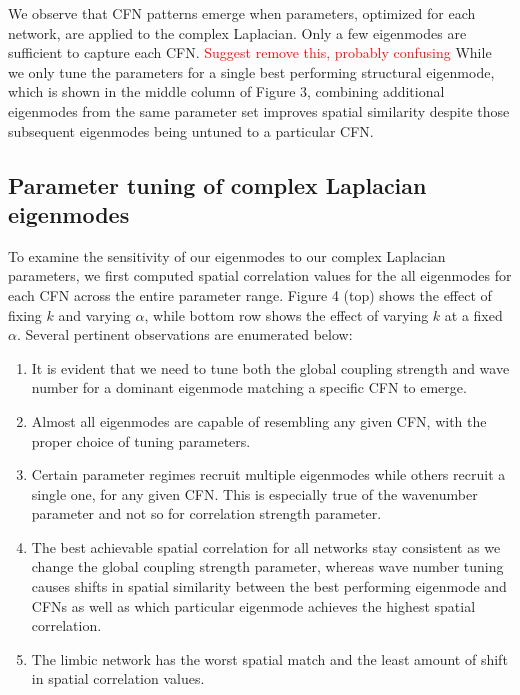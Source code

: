 \documentclass{article}
\begin{document}
We observe that CFN patterns emerge when parameters, optimized for each network, are applied to the complex Laplacian. Only a few eigenmodes are sufficient to capture each CFN. \textcolor{red}{Suggest remove this, probably confusing} While we only tune the parameters for a single best performing structural eigenmode, which is shown in the middle column of Figure 3, combining additional eigenmodes from the same parameter set improves spatial similarity despite those subsequent eigenmodes being untuned to a particular CFN.


\subsection{Parameter tuning of complex Laplacian eigenmodes}
To examine the sensitivity of our eigenmodes to our complex Laplacian parameters, we first computed spatial correlation values for the all eigenmodes for each CFN across the entire parameter range. Figure 4 (top) shows the effect of fixing $k$ and varying $\alpha$, while bottom row shows the effect of varying $k$ at a fixed $\alpha$. Several pertinent observations are enumerated below:
\begin{enumerate}
    \item It is evident that we need to tune both the global coupling strength and wave number for a dominant eigenmode matching a specific CFN to emerge.
    \item Almost all eigenmodes are capable of resembling any given CFN, with the proper choice of tuning parameters.
    \item Certain parameter regimes recruit multiple eigenmodes while others recruit a single one, for any given CFN. This is especially true of the wavenumber parameter and not so for correlation strength parameter.
    \item The best achievable spatial correlation for all networks stay consistent as we change the global coupling strength parameter, whereas wave number tuning causes shifts in spatial similarity between the best performing eigenmode and CFNs as well as which particular eigenmode achieves the highest spatial correlation.
    \item The limbic network has the worst spatial match and the least amount of shift in spatial correlation values.

\end{enumerate}
\end{document}
